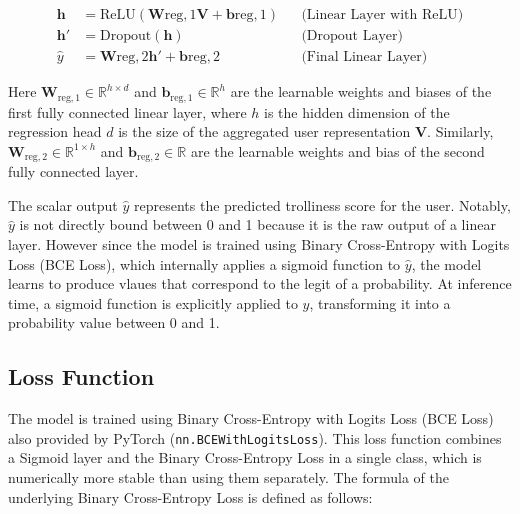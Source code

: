 \documentclass[twoside]{ctuthesis}
\theoremstyle{plain}
\theoremstyle{definition}
\theoremstyle{note}
\begin{document}

\begin{align}
  \mathbf{h} &= \mathrm{ReLU}(\mathbf{W}{\mathrm{reg,1}} \mathbf{V} + \mathbf{b}{\mathrm{reg,1}}) && \text{(Linear Layer with ReLU)} \\
  \mathbf{h'} &= \mathrm{Dropout}(\mathbf{h}) && \text{(Dropout Layer)} \\  
  \hat{y} &= \mathbf{W}{\mathrm{reg,2}} \mathbf{h'} + \mathbf{b}{\mathrm{reg,2}} && \text{(Final Linear Layer)}
\end{align}

Here \( \mathbf{W}_{\mathrm{reg,1}} \in \mathbb{R}^{h \times d} \) and \( \mathbf{b}_{\mathrm{reg,1}} \in \mathbb{R}^{h} \) are the learnable weights and biases of the first fully connected linear layer, where \( h \) is the hidden dimension of the regression head \( d \) is the size of the aggregated user representation \( \mathbf{V} \). Similarly, \( \mathbf{W}_{\mathrm{reg,2}} \in \mathbb{R}^{1 \times h} \) and \( \mathbf{b}_{\mathrm{reg,2}} \in \mathbb{R} \) are the learnable weights and bias of the second fully connected layer.

The scalar output \( \hat{y} \) represents the predicted trolliness score for the user. Notably, \( \hat{y} \) is not directly bound between 0 and 1 because it is the raw output of a linear layer. However since the model is trained using Binary Cross-Entropy with Logits Loss (BCE Loss), which internally applies a sigmoid function to \( \hat{y} \), the model learns to produce vlaues that correspond to the legit of a probability. At inference time, a sigmoid function is explicitly applied to \( \hat{y} \), transforming it into a probability value between 0 and 1.

\subsection{Loss Function}

The model is trained using Binary Cross-Entropy with Logits Loss (BCE Loss) also provided by PyTorch (\texttt{nn.BCEWithLogitsLoss}). This loss function combines a Sigmoid layer and the Binary Cross-Entropy Loss in a single class, which is numerically more stable than using them separately. The formula of the underlying Binary Cross-Entropy Loss is defined as follows:
\end{document}
